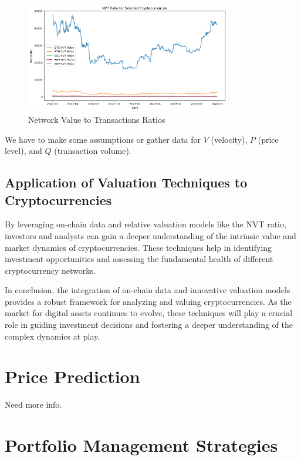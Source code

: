 \documentclass{ledger}
\begin{document}
\begin{figure}
    \centering
    \includegraphics[width=0.8\textwidth]{./code/valuation-techniques/nvt_ratio.png}
    \caption{Network Value to Transactions Ratios}
    \label{fig:beta}
\end{figure}

We have to make some assumptions or gather data for $V$ (velocity), $P$ (price level), and $Q$ (transaction volume).

\hfill \break

\subsection{Application of Valuation Techniques to Cryptocurrencies}

By leveraging on-chain data and relative valuation models like the NVT ratio, investors and analysts can gain a deeper understanding of the intrinsic value and market dynamics of cryptocurrencies. These techniques help in identifying investment opportunities and assessing the fundamental health of different cryptocurrency networks.

In conclusion, the integration of on-chain data and innovative valuation models provides a robust framework for analyzing and valuing cryptocurrencies. As the market for digital assets continues to evolve, these techniques will play a crucial role in guiding investment decisions and fostering a deeper understanding of the complex dynamics at play.



\section{Price Prediction}

Need more info.

\section{Portfolio Management Strategies}
\end{document}
